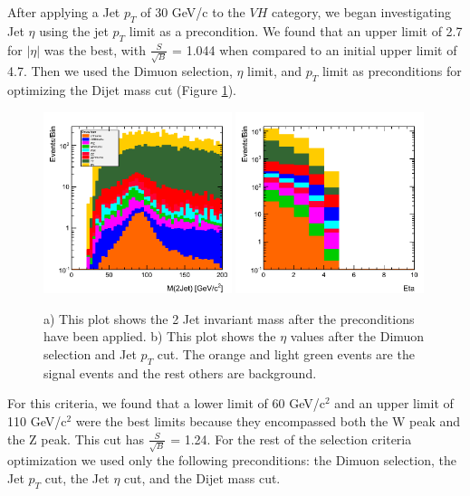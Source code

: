 \documentclass[12pt]{article}
\begin{document}
After applying a Jet $p_{T}$ of 30 GeV/c to the $VH$ category, we began investigating Jet $\eta$ using the jet $p_{T}$ limit as a precondition.  
We found that an upper limit of 2.7 for $|\eta|$ was the best, with $\frac{S}{\sqrt{B}}$ = 1.044 when compared to an initial upper limit of 4.7. 
Then we used the Dimuon selection, $\eta$ limit, and $p_{T}$ limit as preconditions for optimizing the Dijet mass cut (Figure \ref{fig:Mjj}).
\begin{figure}[!hbtp]
\begin{center}
    \includegraphics[width=0.49\textwidth]{images/Hist_jetMass.png}
    \includegraphics[width=0.49\textwidth]{images/Hist_jetEta.png}
    \caption{ \label{fig:Mjj}
         a) This plot shows the 2 Jet invariant mass after the preconditions have been applied. b) This plot shows the $\eta$
	 values after the Dimuon selection and Jet $p_{T}$ cut. The orange and light green events are the signal events and the rest others
	 are background.
      }
\end{center}
\end{figure}
For this criteria, we found that a lower limit of 60 GeV/c$^{2}$ and an upper limit of 110 GeV/c$^{2}$ were the best limits 
because they encompassed both the W peak and the Z peak. 
This cut has $\frac{S}{\sqrt{B}}$ = 1.24. For the rest of the selection criteria optimization we used only the following preconditions: 
the Dimuon selection, the Jet $p_{T}$ cut, the Jet $\eta$ cut, and the Dijet mass cut.
\end{document}
